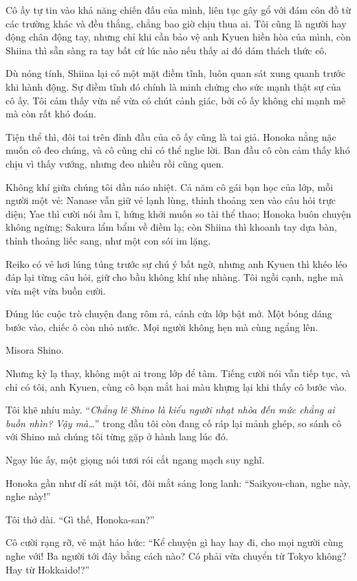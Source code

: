 \documentclass[../main.tex]{subfiles}
\begin{document}
Cô ấy tự tin vào khả năng chiến đấu của mình, liên tục gây gổ với đám côn đồ từ các trường khác và đều thắng, chẳng bao giờ chịu thua ai. Tôi cũng là người hay động chân động tay, nhưng chỉ khi cần bảo vệ anh Kyuen hiền hòa của mình, còn Shiina thì sẵn sàng ra tay bất cứ lúc nào nếu thấy ai đó dám thách thức cô.

Dù nóng tính, Shiina lại có một mặt điềm tĩnh, luôn quan sát xung quanh trước khi hành động. Sự điềm tĩnh đó chính là minh chứng cho sức mạnh thật sự của cô ấy. Tôi cảm thấy vừa nể vừa có chút cảnh giác, bởi cô ấy không chỉ mạnh mẽ mà còn rất khó đoán.

Tiện thể thì, đôi tai trên đỉnh đầu của cô ấy cũng là tai giả. Honoka nằng nặc muốn cô đeo chúng, và cô cũng chỉ có thể nghe lời. Ban đầu cô còn cảm thấy khó chịu vì thấy vướng, nhưng đeo nhiều rồi cũng quen.

\chrint

Không khí giữa chúng tôi dần náo nhiệt. Cả năm cô gái bạn học của lớp, mỗi người một vẻ: Nanase vẫn giữ vẻ lạnh lùng, thỉnh thoảng xen vào câu hỏi trực diện; Yae thì cười nói ầm ĩ, hứng khởi muốn so tài thể thao; Honoka buôn chuyện không ngừng; Sakura lẩm bẩm về điềm lạ; còn Shiina thì khoanh tay dựa bàn, thỉnh thoảng liếc sang, như một con sói im lặng.

Reiko có vẻ hơi lúng túng trước sự chú ý bất ngờ, nhưng anh Kyuen thì khéo léo đáp lại từng câu hỏi, giữ cho bầu không khí nhẹ nhàng. Tôi ngồi cạnh, nghe mà vừa mệt vừa buồn cười.

Đúng lúc cuộc trò chuyện đang rôm rả, cánh cửa lớp bật mở. Một bóng dáng bước vào, chiếc ô còn nhỏ nước. Mọi người không hẹn mà cùng ngẩng lên.

Misora Shino.

Nhưng kỳ lạ thay, không một ai trong lớp để tâm. Tiếng cười nói vẫn tiếp tục, và chỉ có tôi, anh Kyuen, cùng cô bạn mắt hai màu khựng lại khi thấy cô bước vào.


Tôi khẽ nhíu mày. ``\textit{Chẳng lẽ Shino là kiểu người nhạt nhòa đến mức chẳng ai buồn nhìn? Vậy mà\dots}'' trong đầu tôi còn đang cố ráp lại mảnh ghép, so sánh cô với Shino mà chúng tôi từng gặp ở hành lang lúc đó.

Ngay lúc ấy, một giọng nói tươi rói cắt ngang mạch suy nghĩ.

Honoka gần như dí sát mặt tôi, đôi mắt sáng long lanh: ``Saikyou-chan, nghe này, nghe này!''

Tôi thở dài. ``Gì thế, Honoka-san?''

Cô cười rạng rỡ, vẻ mặt háo hức: ``Kể chuyện gì hay hay đi, cho mọi người cùng nghe với! Ba người tới đây bằng cách nào? Có phải vừa chuyển từ Tokyo không? Hay từ Hokkaido!?''
\end{document}
